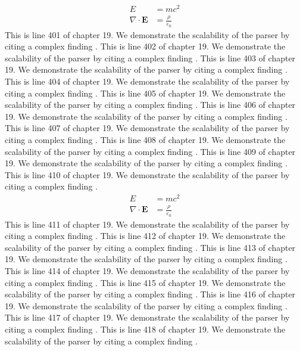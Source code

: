 \begin{align*}
  E &= mc^2 \\
  \nabla \cdot \mathbf{E} &= \frac{\rho}{\varepsilon_0}
\end{align*}
This is line 401 of chapter 19. We demonstrate the scalability of the parser by citing a complex finding \cite{ref19_401}.
This is line 402 of chapter 19. We demonstrate the scalability of the parser by citing a complex finding \cite{ref19_402}.
This is line 403 of chapter 19. We demonstrate the scalability of the parser by citing a complex finding \cite{ref19_403}.
This is line 404 of chapter 19. We demonstrate the scalability of the parser by citing a complex finding \cite{ref19_404}.
This is line 405 of chapter 19. We demonstrate the scalability of the parser by citing a complex finding \cite{ref19_405}.
This is line 406 of chapter 19. We demonstrate the scalability of the parser by citing a complex finding \cite{ref19_406}.
This is line 407 of chapter 19. We demonstrate the scalability of the parser by citing a complex finding \cite{ref19_407}.
This is line 408 of chapter 19. We demonstrate the scalability of the parser by citing a complex finding \cite{ref19_408}.
This is line 409 of chapter 19. We demonstrate the scalability of the parser by citing a complex finding \cite{ref19_409}.
This is line 410 of chapter 19. We demonstrate the scalability of the parser by citing a complex finding \cite{ref19_410}.
\begin{align*}
  E &= mc^2 \\
  \nabla \cdot \mathbf{E} &= \frac{\rho}{\varepsilon_0}
\end{align*}
This is line 411 of chapter 19. We demonstrate the scalability of the parser by citing a complex finding \cite{ref19_411}.
This is line 412 of chapter 19. We demonstrate the scalability of the parser by citing a complex finding \cite{ref19_412}.
This is line 413 of chapter 19. We demonstrate the scalability of the parser by citing a complex finding \cite{ref19_413}.
This is line 414 of chapter 19. We demonstrate the scalability of the parser by citing a complex finding \cite{ref19_414}.
This is line 415 of chapter 19. We demonstrate the scalability of the parser by citing a complex finding \cite{ref19_415}.
This is line 416 of chapter 19. We demonstrate the scalability of the parser by citing a complex finding \cite{ref19_416}.
This is line 417 of chapter 19. We demonstrate the scalability of the parser by citing a complex finding \cite{ref19_417}.
This is line 418 of chapter 19. We demonstrate the scalability of the parser by citing a complex finding \cite{ref19_418}.
